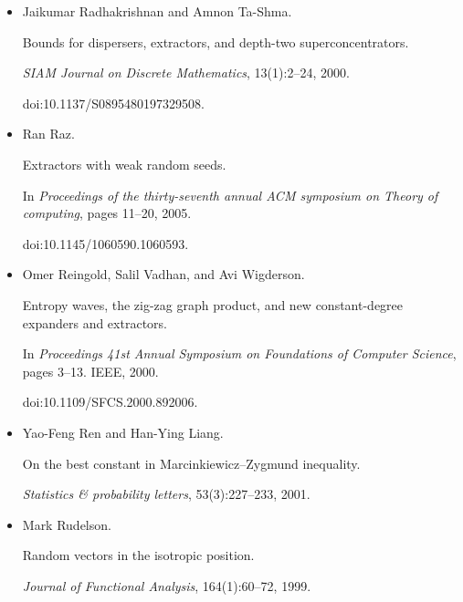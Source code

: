 \begin{itemize}
doi:10.1006/JCSS.1996.0004.





\item[] 
[29]

Jaikumar Radhakrishnan and Amnon Ta-Shma.


Bounds for dispersers, extractors, and depth-two superconcentrators.


\emph{SIAM Journal on Discrete Mathematics}, 13(1):2–24, 2000.


doi:10.1137/S0895480197329508.





\item[] 
[30]

Ran Raz.


Extractors with weak random seeds.


In \emph{Proceedings of the thirty-seventh annual ACM symposium on
Theory of computing}, pages 11–20, 2005.


doi:10.1145/1060590.1060593.





\item[] 
[31]

Omer Reingold, Salil Vadhan, and Avi Wigderson.


Entropy waves, the zig-zag graph product, and new constant-degree
expanders and extractors.


In \emph{Proceedings 41st Annual Symposium on Foundations of Computer
Science}, pages 3–13. IEEE, 2000.


doi:10.1109/SFCS.2000.892006.





\item[] 
[32]

Yao-Feng Ren and Han-Ying Liang.


On the best constant in Marcinkiewicz–Zygmund inequality.


\emph{Statistics \& probability letters}, 53(3):227–233, 2001.





\item[] 
[33]

Mark Rudelson.


Random vectors in the isotropic position.


\emph{Journal of Functional Analysis}, 164(1):60–72, 1999.






\end{itemize}
